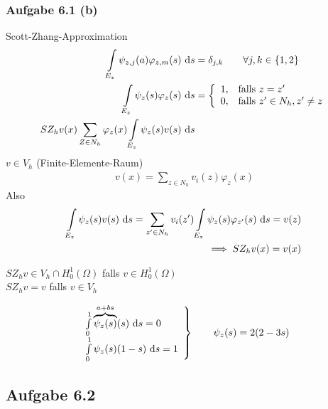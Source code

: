 \subsubsection{Aufgabe 6.1 (b)}
Scott-Zhang-Approximation
\begin{align*}
	\int\limits_{E_z}\psi_{z,j}(a)\varphi_{z,m}(s)\text{ d} s
	&=\delta_{j,k}\qquad\forall j,k\in\lbrace1,2\rbrace\\
	\int\limits_{E_z}\psi_z(s)\varphi_z(s)\text{ d} s
	&=\left\lbrace\begin{array}{cl}
		1, &\text{falls } z=z'\\
		0, &\text{falls } z'\in N_h,z'\neq z
	\end{array}\right.\\
	SZ_h v(x)
	\sum\limits_{Z\in N_h}\varphi_z(x)\int\limits_{E_z}\psi_z(s)v(s)\text{ d} s
\end{align*}
$v\in V_h$ (Finite-Elemente-Raum)
\begin{align*}
	v(x)=\sum\limits_{z\in N_h} v_i(z)\varphi_z(x)
\end{align*}
Also
\begin{align*}
	\int\limits_{E_z}\psi_z(s)v(s)\text{ d} s
	=\sum\limits_{z'\in N_h} v_i(z')\int\limits_{E_z}\psi_z(s)\varphi_{z'}(s)\text{ d} s
	=v(z)\\
	\implies
	SZ_h v(x)=v(x)
\end{align*}

$SZ_h v\in V_h\cap H_0^1(\Omega)$ falls $v\in H_0^1(\Omega)$\\
$SZ_h v=v$ falls $v\in V_h$

\begin{align*}
	\left.\begin{array}{l}
			\int\limits_0^1\overbrace{\psi_z(s)}^{a+bs}(s)\text{ d} s=0\\
		\int\limits_0^1\psi_z(s)(1-s)\text{ d} s=1
	\end{array}\right\rbrace\qquad
	\psi_z(s)=2(2-3s)
\end{align*}

\subsection{Aufgabe 6.2}
